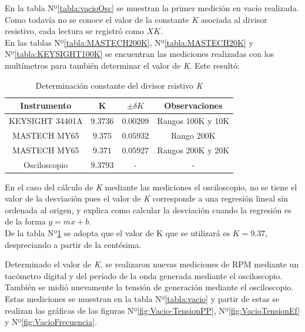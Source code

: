 \documentclass[a4paper,11pt,twoside]{IT-CNEA}
\begin{document}
\par En la tabla Nº\ref{tabla:vacioOsc} se muestran la primer medición en vacío realizada. Como todavía no se conoce el valor de la constante \textit{K} asociada al divisor resistivo, cada lectura se registró como $XK$.
\\En las tablas Nº\ref{tabla:MASTECH200K}, Nº\ref{tabla:MASTECH20K} y Nº\ref{tabla:KEYSIGHT100K} se encuentran las mediciones realizadas con los multímetros para también determinar el valor de \textit{K}. Este resultó:
\begin{table}[h!]
\centering
\caption{Determinación constante del divisor rsistivo \textit{K}}
\label{tabla:determinacionK}
\begin{tabular}{|c|c|c|c|}
\hline
Instrumento  & K & $\pm \delta K$ & Observaciones\\ \hline 
KEYSIGHT 34401A &$9.3736$&$0.00209$&Rangos 100K y 10K \\ \hline
MASTECH MY65 & $9.375$ & $0.05932$ &Rango 200K\\ \hline
MASTECH MY65 & $9.371$ & $0.05927$ &Rangos 200K y 20K\\ \hline
Osciloscopio& $9.3793$ & - & - \\ \hline
\end{tabular}
\end{table}
\par En el caso del cálculo de \textit{K} mediante las mediciones el osciloscopio, no se tiene el valor de la desviación pues el valor de \textit{K} corresponde a una regresión lineal sin ordenada al origen, y \cite{taylor} explica como calcular la desviación cuando la regresión es de la forma $y=mx+b$.
\\De la tabla Nº\ref{tabla:determinacionK} se adopta que el valor de K que se utilizará es $K=9.37$, despreciando a partir de la centésima.
\par Determinado el valor de \textit{K}, se realizaron nuevas mediciones de RPM mediante un tacómetro digital y del período de la onda generada mediante el osciloscopio. También se midió nuevamente la tensión de generación mediante el osciloscopio. Estas mediciones se muestran en la tabla Nº\ref{tabla:vacio} y partir de estas se realizan las gráficas de las figuras Nº\ref{fig:Vacio-TensionPP}, Nº\ref{fig:VacioTensionEf} y Nº\ref{fig:VacioFrecuencia}.
\end{document}
